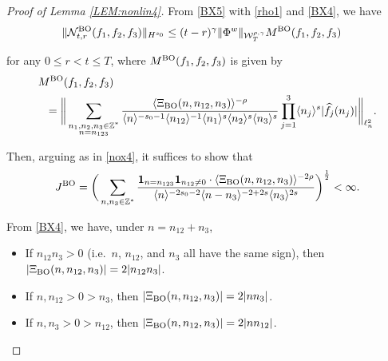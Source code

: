\documentclass[letterpaper, 11pt,  reqno]{amsart}
\newcommand{\1}{\hspace{0.5mm}\text{I}\hspace{0.5mm}}
\newcommand{\noi}{\noindent}
\newcommand{\Z}{\mathbb{Z}}
\newcommand{\g}{\gamma}
\newcommand{\ft}{\widehat}
\renewcommand{\l}{\ell}
\newcommand{\jb}[1]
{\langle #1 \rangle}
\newcommand{\ind}{\mathbf 1}
\newcommand{\NN}{\mathcal{N}}
\newcommand{\W}{\mathcal{W}}
\newcommand{\BO}{\text{\rm BO} }
\numberwithin{equation}{section}
\numberwithin{theorem}{section}
\begin{document}
\begin{proof}[Proof of Lemma \ref{LEM:nonlin4}]





From \eqref{BX5} with \eqref{rho1} and \eqref{BX4}, we have
\begin{align*}
 \| \NN^\BO_{t, r}(f_1, f_2,  f_3)\|_{H^{s_0}}
&  \le
(t-r)^\g \|\Phi^w\|_{  \W^{\rho,\g}_T}M^\BO(f_1, f_2, f_3)
\end{align*}

\noi
for any $0 \le r < t \le T$, 
where $M^\BO(f_1, f_2, f_3)$ is given by 
\begin{align*}
& M^\BO(f_1, f_2, f_3)\\
& \ \  =\bigg\|
\sum_{\substack{n_1, n_2, n_3 \in \Z^*\\n = n_{123}}}
\frac{\jb{\Xi_\BO(n, n_{12}, n_3)}^{-\rho}}{\jb{n}^{-s_0 - 1}
\jb{n_{12}}^{-1}
\jb{n_1}^{s}\jb{n_2}^{s}\jb{n_3}^{s}} 
\prod_{j = 1}^3\jb{n_j}^s|\ft f_j(n_j)|
\bigg\|_{\l^2_n}.
\end{align*}


\noi
Then, arguing as in \eqref{nox4}, 
it suffices to show that 
\begin{align*}
 J^\BO
= \bigg(\sum_{n,  n_3 \in \Z^*}
\frac{\ind_{n = n_{123}}
\ind_{n_{12} \ne0}
\cdot \jb{\Xi_\BO(n, n_{12}, n_3)}^{-2\rho}}
{\jb{n}^{-2s_0 - 2}
\jb{n - n_3}^{-2+2s}
\jb{n_3}^{2s}} 
\bigg)^\frac 12 < \infty.
\end{align*}







From \eqref{BX4}, we have, under $n = n_{12} + n_3$,  

\smallskip

\begin{itemize}
\item[(a)]
If $n_{12}n_3>0$ (i.e.~$n$, $n_{12}$, and $n_3$ all have the same sign), 
then  $|\Xi_\BO(n, n_{12}, n_3)|=2|n_{12}n_3|$.


\smallskip


\item[(b)]
If $n, n_{12}>0>n_3$,  then  $|\Xi_\BO(n, n_{12}, n_3)|=2|n n_3|$.



\smallskip


\item[(c)]


If $n, n_3>0>n_{12}$,  then  $|\Xi_\BO(n, n_{12}, n_3)|=2|n n_{12}|$.



\end{itemize}
\end{proof}
\end{document}
